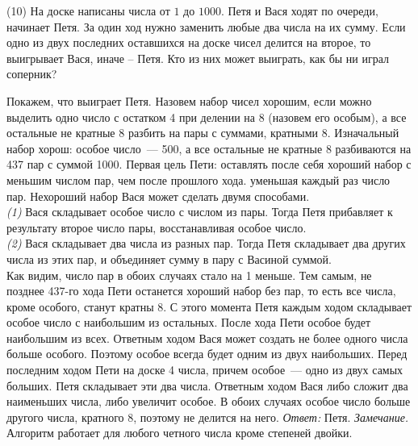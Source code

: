 \textsf{(10)}
На доске написаны числа от $1$ до $1000$.
Петя и Вася ходят по очереди, начинает Петя.
За один ход нужно заменить любые два числа на их сумму.
Если одно из двух последних оставшихся на доске чисел делится на второе, то
выигрывает Вася, иначе – Петя.
Кто из них может выиграть, как бы ни играл соперник?

\solution
Покажем, что выиграет Петя.
Назовем набор чисел хорошим, если можно выделить одно число с остатком 4 при
делении на 8 (назовем его особым), а все остальные не кратные 8 разбить на пары
с суммами, кратными 8.
Изначальный набор хорош: особое число~--- 500, а все остальные не кратные 8
разбиваются на 437 пар с суммой 1000.
Первая цель Пети: оставлять после себя хороший набор с меньшим числом пар, чем
после прошлого хода. уменьшая каждый раз число пар.
Нехороший набор Вася может сделать двумя способами.
\\\emph{(1)}
Вася складывает особое число с числом из пары.
Тогда Петя прибавляет к результату второе число пары, восстанавливая особое
число.
\\\emph{(2)}
Вася складывает два числа из разных пар.
Тогда Петя складывает два других числа из этих пар, и объединяет сумму в пару с
Васиной суммой.
\\
Как видим, число пар в обоих случаях стало на 1 меньше.
Тем самым, не позднее 437-го хода Пети останется хороший набор без пар, то есть
все числа, кроме особого, станут кратны 8.
С этого момента Петя каждым ходом складывает особое число с наибольшим из
остальных.
После хода Пети особое будет наибольшим из всех.
Ответным ходом Вася может создать не более одного числа больше особого.
Поэтому особое всегда будет одним из двух наибольших.
Перед последним ходом Пети на доске 4 числа, причем особое~--- одно из двух
самых больших.
Петя складывает эти два числа.
Ответным ходом Вася либо сложит два наименьших числа, либо увеличит особое.
В обоих случаях особое число больше другого числа, кратного 8, поэтому не
делится на него.
\emph{Ответ:}
Петя.
\emph{Замечание.}
Алгоритм работает для любого четного числа кроме степеней двойки.

